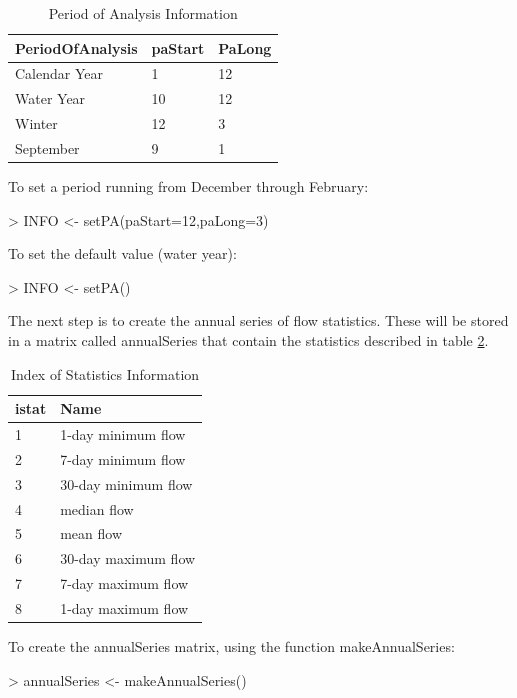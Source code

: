 \documentclass[a4paper,11pt]{article}
\begin{document}
\begin{table}[!ht]
\centering
\caption{Period of Analysis Information} 
\label{table:paINFO}
\begin{tabular}{lll}
  \hline
PeriodOfAnalysis & paStart & PaLong \\ 
  \hline
Calendar Year & 1 & 12 \\ 
  Water Year & 10 & 12 \\ 
  Winter & 12 & 3 \\ 
  September & 9 & 1 \\ 
   \hline
\end{tabular}
\end{table}

To set a period running from December through February:
\begin{Schunk}
\begin{Sinput}
> INFO <- setPA(paStart=12,paLong=3)
\end{Sinput}
\end{Schunk}

To set the default value (water year):
\begin{Schunk}
\begin{Sinput}
> INFO <- setPA()
\end{Sinput}
\end{Schunk}

The next step is to create the annual series of flow statistics.  These will be stored in a matrix called annualSeries that contain the statistics described in table \ref{table:istat}.

\begin{table}[!ht]
\centering
\caption{Index of Statistics Information} 
\label{table:istat}
\begin{tabular}{ll}
  \hline
istat & Name \\ 
  \hline
1 & 1-day minimum flow \\ 
  2 & 7-day minimum flow \\ 
  3 & 30-day minimum flow \\ 
  4 & median flow \\ 
  5 & mean flow \\ 
  6 & 30-day maximum flow \\ 
  7 & 7-day maximum flow \\ 
  8 & 1-day maximum flow \\ 
   \hline
\end{tabular}
\end{table}

To create the annualSeries matrix, using the function makeAnnualSeries:
\begin{Schunk}
\begin{Sinput}
> annualSeries <- makeAnnualSeries()
\end{Sinput}
\end{Schunk}
\end{document}
